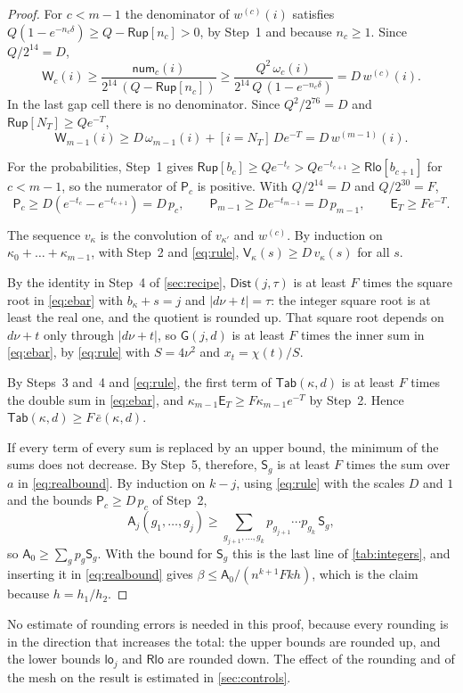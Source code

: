 \begin{proof}
For $c<m-1$ the denominator of $w^{(c)}(i)$ satisfies $Q(1-e^{-n_c\delta})\ge Q-\mathsf{Rup}[n_c]>0$, by Step~1 and because $n_c\ge1$. Since $Q/2^{14}=D$,
\[
\mathsf{W}_c(i)\ge\frac{\mathsf{num}_c(i)}{2^{14}\,(Q-\mathsf{Rup}[n_c])}\ge\frac{Q^2\,\omega_c(i)}{2^{14}\,Q\,(1-e^{-n_c\delta})}=D\,w^{(c)}(i).
\]
In the last gap cell there is no denominator. Since $Q^2/2^{76}=D$ and $\mathsf{Rup}[N_T]\ge Qe^{-T}$,
\[
\mathsf{W}_{m-1}(i)\ge D\,\omega_{m-1}(i)+[i=N_T]\,De^{-T}=D\,w^{(m-1)}(i).
\]

For the probabilities, Step~1 gives $\mathsf{Rup}[b_c]\ge Qe^{-t_c}>Qe^{-t_{c+1}}\ge\mathsf{Rlo}[b_{c+1}]$ for $c<m-1$, so the numerator of $\mathsf{P}_c$ is positive. With $Q/2^{14}=D$ and $Q/2^{30}=F$,
\[
\mathsf{P}_c\ge D(e^{-t_c}-e^{-t_{c+1}})=D\,p_c,\qquad\mathsf{P}_{m-1}\ge De^{-t_{m-1}}=D\,p_{m-1},\qquad\mathsf{E}_T\ge Fe^{-T}.
\]

 The sequence $v_\kappa$ is the convolution of $v_{\kappa'}$ and $w^{(c)}$. By induction on $\kappa_0+\dots+\kappa_{m-1}$, with Step~2 and \eqref{eq:rule}, $\mathsf{V}_\kappa(s)\ge D\,v_\kappa(s)$ for all $s$.

 By the identity in Step~4 of \cref{sec:recipe}, $\mathsf{Dist}(j,\tau)$ is at least $F$ times the square root in \eqref{eq:ebar} with $b_\kappa+s=j$ and $|d\nu+t|=\tau$: the integer square root is at least the real one, and the quotient is rounded up. That square root depends on $d\nu+t$ only through $|d\nu+t|$, so $\mathsf{G}(j,d)$ is at least $F$ times the inner sum in \eqref{eq:ebar}, by \eqref{eq:rule} with $S=4\nu^2$ and $x_t=\chi(t)/S$.

 By Steps~3 and~4 and \eqref{eq:rule}, the first term of $\mathsf{Tab}(\kappa,d)$ is at least $F$ times the double sum in \eqref{eq:ebar}, and $\kappa_{m-1}\mathsf{E}_T\ge F\kappa_{m-1}e^{-T}$ by Step~2. Hence $\mathsf{Tab}(\kappa,d)\ge F\,\bar e(\kappa,d)$.

 If every term of every sum is replaced by an upper bound, the minimum of the sums does not decrease. By Step~5, therefore, $\mathsf{S}_g$ is at least $F$ times the sum over $a$ in \eqref{eq:realbound}. By induction on $k-j$, using \eqref{eq:rule} with the scales $D$ and $1$ and the bounds $\mathsf{P}_c\ge D\,p_c$ of Step~2,
\[
\mathsf{A}_{j}(g_1,\dots,g_{j})\ge\sum_{g_{j+1},\dots,g_k}p_{g_{j+1}}\cdots p_{g_k}\,\mathsf{S}_g ,
\]
so $\mathsf{A}_0\ge\sum_gp_g\mathsf{S}_g$. With the bound for $\mathsf{S}_g$ this is the last line of \cref{tab:integers}, and inserting it in \eqref{eq:realbound} gives $\beta\le\mathsf{A}_0/(n^{k+1}Fkh)$, which is the claim because $h=h_1/h_2$.
\end{proof}

\begin{rem}\label{rem:rounding}
No estimate of rounding errors is needed in this proof, because every rounding is in the direction that increases the total: the upper bounds are rounded up, and the lower bounds $\mathsf{lo}_j$ and $\mathsf{Rlo}$ are rounded down. The effect of the rounding and of the mesh on the result is estimated in \cref{sec:controls}.
\end{rem}

